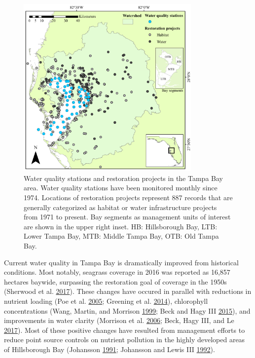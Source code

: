 \documentclass[]{article}
\begin{document}
\begin{figure}
\centerline{\includegraphics[width = 0.8\textwidth]{figs/tbrest_map.pdf}}
\caption{Water quality stations and restoration projects in the Tampa Bay area.  Water quality stations have been monitored monthly since 1974.  Locations of restoration projects represent 887 records that are generally categorized as habitat or water infrastructure projects from 1971 to present.  Bay segments as management units of interest are shown in the upper right inset. HB: Hillsborough Bay, LTB: Lower Tampa Bay, MTB: Middle Tampa Bay, OTB: Old Tampa Bay.}
\label{fig:map}
\end{figure}

Current water quality in Tampa Bay is dramatically improved from
historical conditions. Most notably, seagrass coverage in 2016 was
reported as 16,857 hectares baywide, surpassing the restoration goal of
coverage in the 1950s (Sherwood et al.
\protect\hyperlink{ref-Sherwood17}{2017}). These changes have occured in
parallel with reductions in nutrient loading (Poe et al.
\protect\hyperlink{ref-Poe05}{2005}; Greening et al.
\protect\hyperlink{ref-Greening2014}{2014}), chlorophyll concentrations
(Wang, Martin, and Morrison \protect\hyperlink{ref-Wang99}{1999}; Beck
and Hagy III \protect\hyperlink{ref-Beck15}{2015}), and improvements in
water clarity (Morrison et al. \protect\hyperlink{ref-Morrison06}{2006};
Beck, Hagy III, and Le \protect\hyperlink{ref-Beck17c}{2017}). Most of
these positive changes have resulted from management efforts to reduce
point source controls on nutrient pollution in the highly developed
areas of Hillsborough Bay (Johansson
\protect\hyperlink{ref-Johansson91}{1991}; Johansson and Lewis III
\protect\hyperlink{ref-Johansson92}{1992}).
\end{document}
